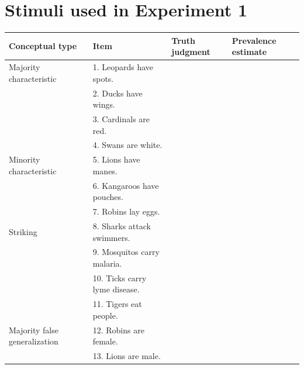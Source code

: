\documentclass[10pt,letterpaper]{article}
\begin{document}
\section{Stimuli used in Experiment 1}
\label{sec:appendix}	

\begin{table}[h]
\begin{tabular}{| l || l | l | l |}
\hline
Conceptual type               & Item                    & Truth judgment & Prevalence estimate \\
\hline \hline
Majority characteristic       & 1. Leopards have spots.    &                &                     \\
                                          & 2. Ducks have wings.                       &                &                     \\
                                          & 3. Cardinals are red.                       &                &                     \\
                                          & 4. Swans are white.                       &                &                     \\
Minority characteristic       & 5. Lions have manes.       &                &                     \\
                                          & 6. Kangaroos have pouches.                        &                &                     \\
                                          & 7. Robins lay eggs.                        &                &                     \\
Striking                      & 8. Sharks attack swimmers. &                &                     \\
                                  & 9. Mosquitos carry malaria.                        &                &                     \\
                                  & 10. Ticks carry lyme disease.                        &                &                     \\
                                  & 11. Tigers eat people.                        &                &                     \\
Majority false generalization & 12. Robins are female.      &                &                     \\
                                              & 13.  Lions are male.                       &                &                     \\

\end{tabular}
\end{table}
\end{document}
